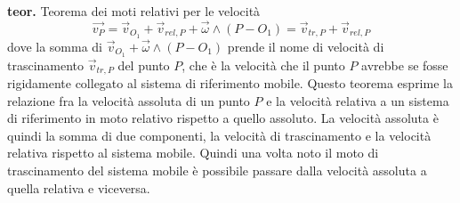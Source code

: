 \textbf{teor.} Teorema dei moti relativi per le velocità
\[
    \vec{v_P} = 
        \vec{v}_{O_1} + \vec{v}_{rel, P} + \vec{\omega} \land (P-O_1) = 
        \vec{v}_{tr,P} + \vec{v}_{rel, P}
\]
dove la somma di $\vec{v}_{O_1} + \vec{\omega} \land (P-O_1)$ prende il nome di velocità di trascinamento $\vec{v}_{tr,P}$ del punto $P$, che è la velocità che il punto $P$ avrebbe se fosse rigidamente collegato al sistema di riferimento mobile.\newline
Questo teorema esprime la relazione fra la velocità assoluta di un punto $P$ e la velocità relativa a un sistema di riferimento in moto relativo rispetto a quello assoluto. La velocità assoluta è quindi la somma di due componenti, la velocità di trascinamento e la velocità relativa rispetto al sistema mobile.\newline
Quindi una volta noto il moto di trascinamento del sistema mobile è possibile passare dalla velocità assoluta a quella relativa e viceversa.
